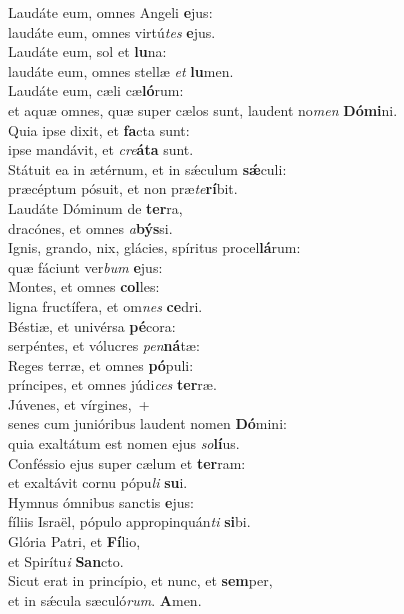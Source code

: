 \evenverse Laudáte eum, omnes Angeli \textbf{e}jus:~\*\\
\evenverse laudáte eum, omnes virtú\textit{tes} \textbf{e}jus.\\
\oddverse Laudáte eum, sol et \textbf{lu}na:~\*\\
\oddverse laudáte eum, omnes stellæ \textit{et} \textbf{lu}men.\\
\evenverse Laudáte eum, cæli cæ\textbf{ló}rum:~\*\\
\evenverse et aquæ omnes, quæ super cælos sunt, laudent no\textit{men} \textbf{Dó}\textbf{mi}ni.\\
\oddverse Quia ipse dixit, et \textbf{fa}cta sunt:~\*\\
\oddverse ipse mandávit, et \textit{cre}\textbf{á}\textbf{ta} sunt.\\
\evenverse Státuit ea in ætérnum, et in sǽculum \textbf{sǽ}culi:~\*\\
\evenverse præcéptum pósuit, et non præ\textit{te}\textbf{rí}bit.\\
\oddverse Laudáte Dóminum de \textbf{ter}ra,~\*\\
\oddverse dracónes, et omnes \textit{a}\textbf{býs}si.\\
\evenverse Ignis, grando, nix, glácies, spíritus procel\textbf{lá}rum:~\*\\
\evenverse quæ fáciunt ver\textit{bum} \textbf{e}jus:\\
\oddverse Montes, et omnes \textbf{col}les:~\*\\
\oddverse ligna fructífera, et om\textit{nes} \textbf{ce}dri.\\
\evenverse Béstiæ, et univérsa \textbf{pé}cora:~\*\\
\evenverse serpéntes, et vólucres \textit{pen}\textbf{ná}tæ:\\
\oddverse Reges terræ, et omnes \textbf{pó}puli:~\*\\
\oddverse príncipes, et omnes júdi\textit{ces} \textbf{ter}ræ.\\
\evenverse Júvenes, et vírgines,~+\\
\evenverse  senes cum junióribus laudent nomen \textbf{Dó}mini:~\*\\
\evenverse quia exaltátum est nomen ejus \textit{so}\textbf{lí}us.\\
\oddverse Conféssio ejus super cælum et \textbf{ter}ram:~\*\\
\oddverse et exaltávit cornu pópu\textit{li} \textbf{su}i.\\
\evenverse Hymnus ómnibus sanctis \textbf{e}jus:~\*\\
\evenverse fíliis Israël, pópulo appropinquán\textit{ti} \textbf{si}bi.\\
\oddverse Glória Patri, et \textbf{Fí}lio,~\*\\
\oddverse et Spirítu\textit{i} \textbf{San}cto.\\
\evenverse Sicut erat in princípio, et nunc, et \textbf{sem}per,~\*\\
\evenverse et in sǽcula sæculó\textit{rum}. \textbf{A}men.\\
